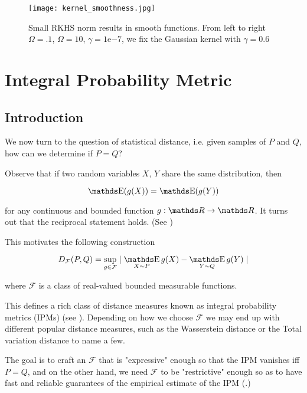\begin{figure}[H]
    \texttt{[image: kernel\_smoothness.jpg]}
    \caption{Small RKHS norm results in smooth functions. 
    From left to right $\Omega = .1$, $\Omega = 10$, $\gamma = 1\mathrm{e}{-7}$, 
    we fix the Gaussian kernel with $\gamma = 0.6$}
    \label{fig:kernel_smoothness} 
\end{figure}




\section{Integral Probability Metric}

\subsection{Introduction}

We now turn to the question of statistical distance, i.e. given samples of $P$ and
$Q$, how can we determine if $P = Q$?

Observe that if two random variables $X$, $Y$ share the same distribution, then 

$$
\E(g(X)) = \E(g(Y))
$$

for any continuous and bounded function $g : \R \rightarrow \R$. 
It turns out that the reciprocal statement holds. (See \cite{TwoSampleTestGrettonBernhard})

This motivates the following construction

$$
D_\mathcal{F} (P, Q) = 
\sup _{g \in \mathcal{F}} \mid \mathop{\E}_{X \sim P} g(X) - \mathop{\E}_{Y \sim Q} g(Y) \mid
$$

where $\mathcal{F}$ is a class of real-valued bounded measurable functions.


This defines a rich class of distance measures known as 
integral probability metrics (IPMs) (see \cite{muller1997integral}). Depending
on how we choose $\mathcal{F}$ we may end up with different popular distance measures, such as
the Wasserstein distance or the Total variation distance to name a few. 

The goal is to craft an $\mathcal{F}$ that is "expressive" enough so that the IPM vanishes iff $P = Q$,
and on the other hand, we need $\mathcal{F}$ to be "restrictive" enough so as to have fast and 
reliable guarantees of the empirical estimate of the IPM (\cite{TwoSampleTestGrettonBernhard}.)


